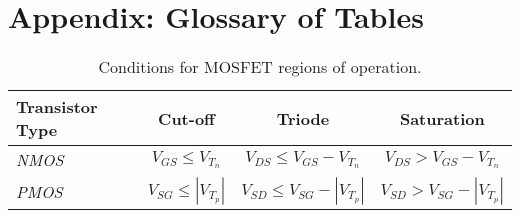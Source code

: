 \newpage
\chapter{Appendix: Glossary of Tables}
    \begin{table}[H]
        \centering
        \setlength{\tabcolsep}{20pt}
        \renewcommand{\arraystretch}{1.5}
        \begin{tabular}{|l|c|c|c|}
            \hline
            \textbf{Transistor Type}  &  \textbf{Cut-off} & \textbf{Triode} & \textbf{Saturation}\\
            \hline
            \textit{NMOS} & $V_{GS} \leq V_{T_n}$
                            & $V_{DS} \leq V_{GS} - V_{T_n}$
                            & $V_{DS} > V_{GS} - V_{T_n}$\\
            \hline
            \textit{PMOS} & $V_{SG} \leq \left|V_{T_p}\right|$
                            & $V_{SD} \leq V_{SG} - \left|V_{T_p}\right|$
                            & $V_{SD} > V_{SG} - \left|V_{T_p}\right|$\\
            \hline
        \end{tabular}
        \caption{Conditions for MOSFET regions of operation.
        \label{tab:mosfet_op}} 
    \end{table}

